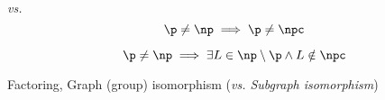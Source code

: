 \begin{frame}{\p{} \emph{vs.} \np{}}
  \[
	\p \neq \np \implies \p \neq \npc
  \]

  \begin{theorem}
	\[
	  \p \neq \np \implies \exists L \in \np \setminus \p \land L \notin \npc
	\]
  \end{theorem}

  \centerline{Factoring, Graph (group) isomorphism {\footnotesize (\emph{vs. Subgraph isomorphism})}}
\end{frame}
